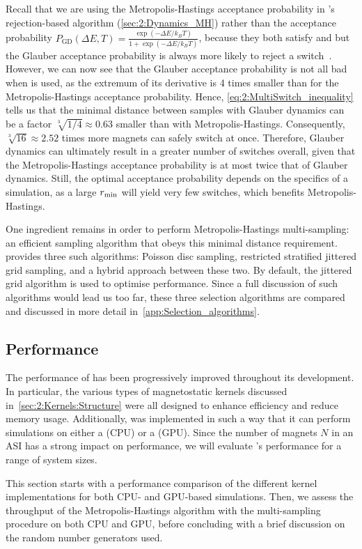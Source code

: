 Recall that we are using the Metropolis-Hastings acceptance probability in \hotspice's rejection-based  algorithm (\cref{sec:2:Dynamics_MH}) rather than the  acceptance probability $P_\mathrm{GD}(\Delta E, T) = \frac{\exp(-\Delta E/k_B T)}{1+\exp(-\Delta E/k_B T)}$, because they both satisfy  and  but the Glauber acceptance probability is always more likely to reject a switch~\cite{bit-player_MCvsGlauber}.
However, we can now see that the Glauber acceptance probability is not all bad when  is used, as the extremum of its derivative is 4 times smaller than for the Metropolis-Hastings acceptance probability.
Hence, \cref{eq:2:MultiSwitch_inequality} tells us that the minimal distance between samples with Glauber dynamics can be a factor $\sqrt[3]{1/4} \approx 0.63$ smaller than with Metropolis-Hastings.
Consequently, $\sqrt[3]{16} \approx 2.52$ times more magnets can safely switch at once.
Therefore, Glauber dynamics can ultimately result in a greater number of switches overall, given that the Metropolis-Hastings acceptance probability is at most twice that of Glauber dynamics. Still, the optimal acceptance probability depends on the specifics of a simulation, as a large $r_\mathrm{min}$ will yield very few switches, which benefits Metropolis-Hastings. \\\par
One ingredient remains in order to perform Metropolis-Hastings multi-sampling: an efficient sampling algorithm that obeys this minimal distance requirement.
\hotspice provides three such algorithms: Poisson disc sampling, restricted stratified jittered grid sampling, and a hybrid approach between these two.
By default, the jittered grid algorithm is used to optimise performance.
Since a full discussion of such algorithms would lead us too far, these three selection algorithms are compared and discussed in more detail in~\cref{app:Selection_algorithms}.

\subsection{Performance}\label{sec:2:Implementation:Performance}
The performance of \hotspice has been progressively improved throughout its development.
In particular, the various types of magnetostatic kernels discussed in~\cref{sec:2:Kernels:Structure} were all designed to enhance efficiency and reduce memory usage.
Additionally, \hotspice was implemented in such a way that it can perform simulations on either a  (CPU) or a  (GPU).
Since the number of magnets $N$ in an ASI has a strong impact on performance, we will evaluate \hotspice's performance for a range of system sizes. \par
This section starts with a performance comparison of the different kernel implementations for both CPU- and GPU-based simulations.
Then, we assess the throughput of the Metropolis-Hastings algorithm with the multi-sampling procedure on both CPU and GPU, before concluding with a brief discussion on the random number generators used.

